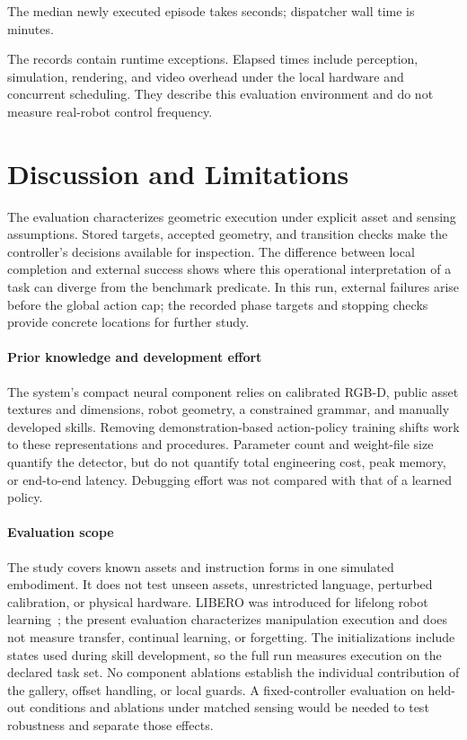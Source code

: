 \documentclass[letterpaper,10pt,conference]{ieeeconf}
\begin{document}
The median newly executed episode takes \FreshMedianSeconds{} seconds;
dispatcher wall time is \RunMinutes{} minutes.

The records contain \RuntimeExceptionCount{} runtime exceptions.
Elapsed times include perception, simulation, rendering, and video overhead
under the local hardware and concurrent scheduling. They describe
this evaluation environment and do not measure real-robot control frequency.

\section{Discussion and Limitations}
The evaluation characterizes geometric execution under explicit asset and
sensing assumptions. Stored targets, accepted geometry, and transition checks
make the controller's decisions available for inspection. The difference
between local completion and external success shows where this operational
interpretation of a task can diverge from the benchmark predicate. In this
run, external failures arise before the global action cap; the recorded phase
targets and stopping checks provide concrete locations for further study.

\paragraph{Prior knowledge and development effort}
The system's compact neural component relies on calibrated RGB-D,
public asset textures and dimensions, robot geometry, a constrained grammar,
and manually developed skills. Removing demonstration-based action-policy
training shifts work to these representations and procedures. Parameter
count and weight-file size quantify the detector, but do not quantify total
engineering cost, peak memory, or end-to-end latency. Debugging effort was
not compared with that of a learned policy.

\paragraph{Evaluation scope}
The study covers known assets and instruction forms in one simulated
embodiment. It does not test unseen assets, unrestricted language, perturbed
calibration, or physical hardware. LIBERO was introduced for lifelong robot
learning~\cite{libero}; the present evaluation characterizes manipulation
execution and does not measure transfer, continual learning, or forgetting.
The initializations include states used during skill development, so the
full run measures execution on the declared task set. No component ablations establish the
individual contribution of the gallery, offset handling, or local guards.
A fixed-controller evaluation on held-out conditions and ablations under
matched sensing would be needed to test robustness and separate those effects.
\end{document}
